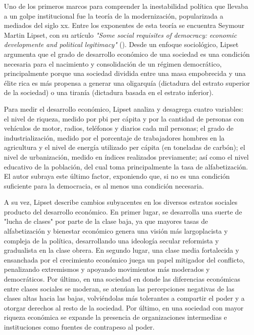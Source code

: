 \documentclass{article}
\begin{document}
Uno de los primeros marcos para comprender la inestabilidad política que llevaba a un golpe
institucional fue la teoría de la modernización, popularizada a mediados del siglo xx. 
Entre los exponentes de esta teoría se
encuentra Seymour Martin Lipset, con su artículo \textit{"Some social requisites 
of democracy: economic developmente and political legitimacy"} (\citeyear{lipset1959some}). 
Desde un enfoque sociológico, Lipset
argumenta que el grado de desarrollo económico de una sociedad es una condición 
necesaria para el nacimiento y consolidación de un régimen democrático, principalmente
porque una sociedad dividida entre una masa empobrecida y una élite rica es más
propensa a generar una oligarquía (dictadura del estrato superior de la sociedad) o una
tiranía (dictadura basada en el estrato inferior).

Para medir el desarrollo económico, Lipset analiza y desagrega cuatro variables:
el nivel de riqueza, medido por pbi per cápita y por la cantidad de personas con vehículos 
de motor, radios, teléfonos y diarios cada mil personas; el grado de industrialización, 
medido por el porcentaje de trabajadores hombres en la agricultura y el nivel de energía 
utilizado per cápita (en toneladas de carbón); el nivel de urbanización, medido en índices 
realizados previamente; así como el nivel educativo de la población, del cual toma 
principalmente la tasa de alfabetización. El autor subraya este último factor, exponiendo
que, si no es una condición suficiente para la democracia, es al menos una condición necesaria.

A su vez, Lipset describe cambios subyacentes en los diversos estratos sociales producto
del desarrollo económico. En primer lugar, se desarrolla una suerte de "lucha de clases" por 
parte de la clase baja, ya que mayores tasas de alfabetización y bienestar económico genera 
una visión más largoplacista y compleja de la política, desarrollando una ideología secular
reformista y gradualista en la clase obrera. En segundo lugar, una clase media fortalecida y 
ensanchada por el crecimiento económico juega un papel mitigador del conflicto, penalizando 
extremismos y apoyando movimientos más moderados y democráticos. Por último, en una sociedad 
en donde las diferencias económicas entre clases sociales se moderan, se atenúan las 
percepciones negativas de las clases altas hacia las bajas, volviéndolas más tolerantes a 
compartir el poder y a otorgar derechos al resto de la sociedad. Por último, en una sociedad 
con mayor riqueza económica se expande la presencia de organizaciones intermedias e 
instituciones como fuentes de contrapeso al poder.
\end{document}
